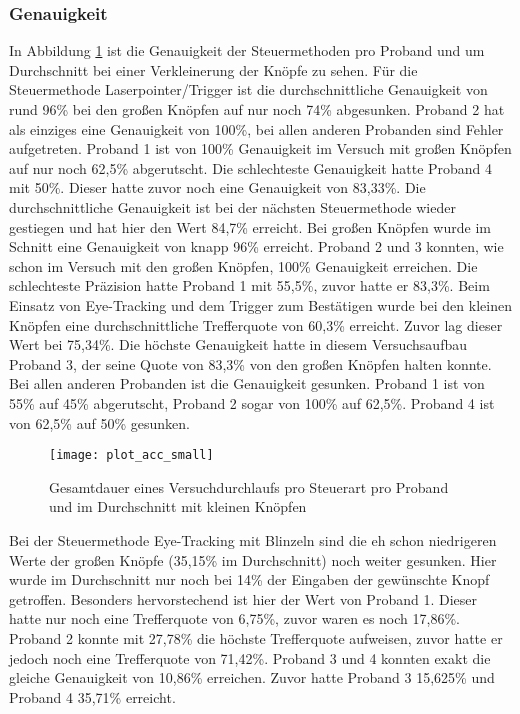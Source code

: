 \subsubsection{Genauigkeit}
In Abbildung \ref{fig:totalACCsmall} ist die Genauigkeit der Steuermethoden pro Proband und um  Durchschnitt bei einer Verkleinerung der Knöpfe zu sehen. Für die Steuermethode Laserpointer/Trigger ist die durchschnittliche Genauigkeit von rund 96\% bei den großen Knöpfen auf nur noch 74\% abgesunken. Proband 2 hat als einziges eine Genauigkeit von 100\%, bei allen anderen Probanden sind Fehler aufgetreten. Proband 1 ist von 100\% Genauigkeit im Versuch mit großen Knöpfen auf nur noch 62,5\% abgerutscht. Die schlechteste Genauigkeit hatte Proband 4 mit 50\%. Dieser hatte zuvor noch eine Genauigkeit von 83,33\%. Die durchschnittliche Genauigkeit ist bei der nächsten Steuermethode wieder gestiegen und hat hier den Wert 84,7\% erreicht. Bei großen Knöpfen wurde im Schnitt eine Genauigkeit von knapp 96\% erreicht. Proband 2 und 3 konnten, wie schon im Versuch mit den großen Knöpfen, 100\% Genauigkeit erreichen. Die schlechteste Präzision hatte Proband 1 mit 55,5\%, zuvor hatte er 83,3\%. Beim Einsatz von Eye-Tracking und dem Trigger zum Bestätigen wurde bei den kleinen Knöpfen eine durchschnittliche Trefferquote von 60,3\% erreicht. Zuvor lag dieser Wert bei 75,34\%. Die höchste Genauigkeit hatte in diesem Versuchsaufbau Proband 3, der seine Quote von 83,3\% von den großen Knöpfen halten konnte. Bei allen anderen Probanden ist die Genauigkeit gesunken. Proband 1 ist von 55\% auf 45\% abgerutscht, Proband 2 sogar von 100\% auf 62,5\%. Proband 4 ist von 62,5\% auf 50\% gesunken.

\begin{figure}[!htbp]
	\centering
	\texttt{[image: plot\_acc\_small]}
	\caption[Gesamtdauer eines Versuchdurchlaufs pro Steuerart pro Proband und im Durchschnitt mit kleinen Knöpfen]{Gesamtdauer eines Versuchdurchlaufs pro Steuerart pro Proband und im Durchschnitt mit kleinen Knöpfen}
	\label{fig:totalACCsmall}
\end{figure}

Bei der Steuermethode Eye-Tracking mit Blinzeln sind die eh schon niedrigeren Werte der großen Knöpfe (35,15\% im Durchschnitt) noch weiter gesunken. Hier wurde im Durchschnitt nur noch bei 14\% der Eingaben der gewünschte Knopf getroffen. Besonders hervorstechend ist hier der Wert von Proband 1. Dieser hatte nur noch eine Trefferquote von 6,75\%, zuvor waren es noch 17,86\%. Proband 2 konnte mit 27,78\% die höchste Trefferquote aufweisen, zuvor hatte er jedoch noch eine Trefferquote von 71,42\%. Proband 3 und 4 konnten exakt die gleiche Genauigkeit von 10,86\% erreichen. Zuvor hatte Proband 3 15,625\% und Proband 4 35,71\% erreicht. 

